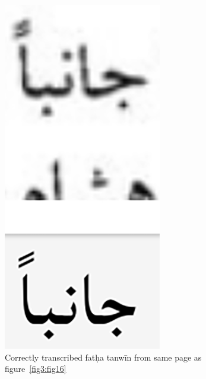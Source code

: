 \begin{figure}[!ht]
	\centering
	\includegraphics[width=\linewidth]{images/image1.png}
	\caption{Correctly transcribed fatḥa tanwīn from same page as figure~\protect\ref{fig3:fig16}}
  	\label{fig3:fig17}
\end{figure}

